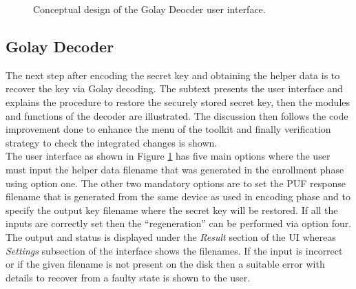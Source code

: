 	\begin{figure}[h]
	\centering
	\caption{Conceptual design of the Golay Deocder user interface.}
	\label{img:golay_decoder_ui}
	\end{figure}
	\subsection{Golay Decoder}
	The next step after encoding the secret key and obtaining the helper data is to recover the key via Golay decoding. The subtext presents the user interface and explains the procedure to restore the securely stored secret key, then the modules and functions of the decoder are illustrated. The discussion then follows the code improvement done to enhance the menu of the toolkit and finally verification strategy to check the integrated changes is shown.\\

	The user interface as shown in Figure \ref{img:golay_decoder_ui} has five main options where the user must input the helper data filename that was generated in the enrollment phase using option one. The other two mandatory options are to set the PUF response filename that is generated from the same device as used in encoding phase and to specify the output key filename where the secret key will be restored. If all the inputs are correctly set then the ``regeneration'' can be performed via option four. The output and status is displayed
	under the \emph{Result} section of the UI whereas \emph{Settings} subsection of the interface shows the filenames. If the input is incorrect or if the given filename is not present on the disk then a suitable error with details to recover from a faulty state is shown to the user.\\

